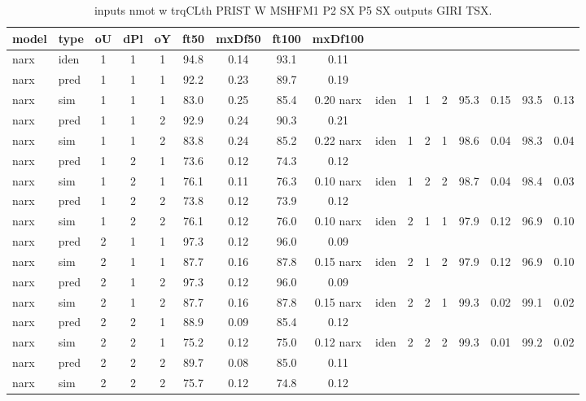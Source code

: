 \begin{center} 
\begin{longtable}{ll|ccc|cc|cc} 
\caption[inputs nmot w trqCLth PRIST W MSHFM1 P2 SX P5 SX   outputs GIRI TSX]{inputs nmot w trqCLth PRIST W MSHFM1 P2 SX P5 SX   outputs GIRI TSX.} 
\label{tab:inputs_nmot_w_trqCLth_PRIST_W_MSHFM1_P2_SX_P5_SX___outputs_GIRI_TSX} 
\hline 
  model & type & oU & dPl & oY & ft50 & mxDf50 & ft100 & mxDf100 \\ 
 \hline 
narx & iden & 1 & 1 & 1 & 94.8 & 0.14 & 93.1 & 0.11 \\ 
narx & pred & 1 & 1 & 1 & 92.2 & 0.23 & 89.7 & 0.19 \\ 
narx & sim  & 1 & 1 & 1 & 83.0 & 0.25 & 85.4 & 0.20 
 \hline 
narx & iden & 1 & 1 & 2 & 95.3 & 0.15 & 93.5 & 0.13 \\ 
narx & pred & 1 & 1 & 2 & 92.9 & 0.24 & 90.3 & 0.21 \\ 
narx & sim  & 1 & 1 & 2 & 83.8 & 0.24 & 85.2 & 0.22 
 \hline 
narx & iden & 1 & 2 & 1 & 98.6 & 0.04 & 98.3 & 0.04 \\ 
narx & pred & 1 & 2 & 1 & 73.6 & 0.12 & 74.3 & 0.12 \\ 
narx & sim  & 1 & 2 & 1 & 76.1 & 0.11 & 76.3 & 0.10 
 \hline 
narx & iden & 1 & 2 & 2 & 98.7 & 0.04 & 98.4 & 0.03 \\ 
narx & pred & 1 & 2 & 2 & 73.8 & 0.12 & 73.9 & 0.12 \\ 
narx & sim  & 1 & 2 & 2 & 76.1 & 0.12 & 76.0 & 0.10 
 \hline 
narx & iden & 2 & 1 & 1 & 97.9 & 0.12 & 96.9 & 0.10 \\ 
narx & pred & 2 & 1 & 1 & 97.3 & 0.12 & 96.0 & 0.09 \\ 
narx & sim  & 2 & 1 & 1 & 87.7 & 0.16 & 87.8 & 0.15 
 \hline 
narx & iden & 2 & 1 & 2 & 97.9 & 0.12 & 96.9 & 0.10 \\ 
narx & pred & 2 & 1 & 2 & 97.3 & 0.12 & 96.0 & 0.09 \\ 
narx & sim  & 2 & 1 & 2 & 87.7 & 0.16 & 87.8 & 0.15 
 \hline 
narx & iden & 2 & 2 & 1 & 99.3 & 0.02 & 99.1 & 0.02 \\ 
narx & pred & 2 & 2 & 1 & 88.9 & 0.09 & 85.4 & 0.12 \\ 
narx & sim  & 2 & 2 & 1 & 75.2 & 0.12 & 75.0 & 0.12 
 \hline 
narx & iden & 2 & 2 & 2 & 99.3 & 0.01 & 99.2 & 0.02 \\ 
narx & pred & 2 & 2 & 2 & 89.7 & 0.08 & 85.0 & 0.11 \\ 
narx & sim  & 2 & 2 & 2 & 75.7 & 0.12 & 74.8 & 0.12 
 \hline 
\end{longtable} 
\end{center}